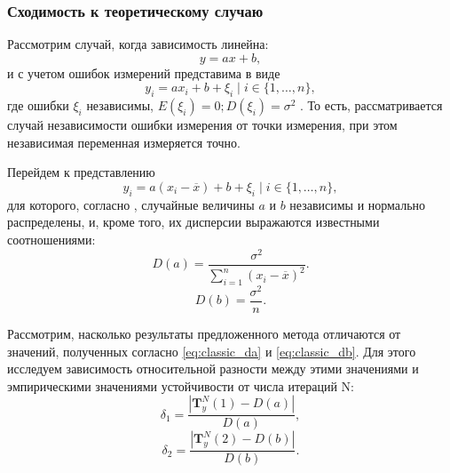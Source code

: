 \documentclass[12pt,a4paper]{article}
\begin{document}

\subsubsection{Сходимость к теоретическому случаю}

Рассмотрим случай, когда зависимость линейна:
\[
  y = ax + b,
\]
и с учетом ошибок измерений представима в виде
\[
  y_i = ax_i + b + \xi_i \mid i \in \{ 1, \dots, n \},
\]
где ошибки $\xi_i$ независимы, $E(\xi_i) = 0; D(\xi_i) = \sigma^2$ \cite{Vatunin05}.
То есть, рассматривается случай независимости ошибки измерения от точки измерения,
при этом независимая переменная измеряется точно.

Перейдем к представлению
\[
  y_i = a(x_i - \overline{x}) + b + \xi_i \mid i \in \{ 1, \dots, n \},
\]
для которого, согласно \cite{Vatunin05}, случайные величины $a$ и $b$ независимы
и нормально распределены, и, кроме того, их дисперсии выражаются известными соотношениями:
\begin{equation}
  \label{eq:classic_da}
  D(a) = \frac{\sigma^2}{\sum_{i = 1}^n (x_i - \overline{x})^2}.
\end{equation}
\begin{equation}
  \label{eq:classic_db}
  D(b) = \frac{\sigma^2}{n}.
\end{equation}

Рассмотрим, насколько результаты предложенного метода отличаются от значений,
полученных согласно \eqref{eq:classic_da} и \eqref{eq:classic_db}. Для этого исследуем
зависимость относительной разности между этими значениями и эмпирическими значениями устойчивости от
числа итераций N:
\[
  \delta_1 = \frac{| \mathbf{T}^N_y(1) - D(a) |}{D(a)},
\]
\[
  \delta_2 = \frac{| \mathbf{T}^N_y(2) - D(b) |}{D(b)}.
\]
\end{document}
